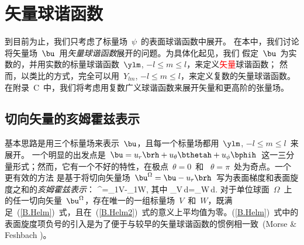 \section{矢量球谐函数}
%
%
\label{section:tv}

到目前为止，我们只考虑了标量场~$\psi$~的表面球谐函数中展开。
在本中，我们讨论将矢量场~$\bu$~用{\em 矢量球谐函数\/}展开的问题。为具体化起见，我们
假定~$\bu$~为实数的，并用实数的标量球谐函数~$\ylm$, $-l\leq m\leq l$，来定义\textcolor{red}{矢量}球谐函数；
然而，以类比的方式，完全可以用~$Y_{lm}$, $-l\leq m\leq l$，来定义复数的矢量球谐函数。
在附录~C~中，我们将考虑用复数广义球谐函数来展开矢量和更高阶的张量场。

\subsection{切向矢量的亥姆霍兹表示}
%
%
%

基本思路是用三个标量场来表示~$\bu$，且每一个标量场都用~$\ylm$, $-l\leq m\leq l$~来展开。
一个明显的出发点是~$\bu=u_r\brh+u_\theta\bthetah+u_\phi\bphih$~这一三分量形式；然而，它有一个不好的特性，在极点~$\theta=0$~和~ $\theta=\pi$~处为奇点。一个更有效的方法
是基于将切向矢量场~$\bu^{\Omega}=\bu-u_r\brh$~写为表面梯度和表面旋度之和的{\em 亥姆霍兹表示\/}：
\eq \label{B.Helm}
\bu^{\Omega}=\bdel_1V-\brh\times\bdel_1W,
\en
其中
\eq \label{B.Helm2}
\int_{\Omega}V\,d\/\Om=\int_{\Omega}W\,d\/.
\en
对于单位球面~$\Omega$~上的任一切向矢量~$\bu^{\Omega}$，存在唯一的一组标量场~$V$~和~$W$，既满足~(\ref{B.Helm})~式，且在~(\ref{B.Helm2})~式的意义上平均值为零。(\ref{B.Helm})~式中的表面旋度项负号的引入是为了便于与较早的矢量球谐函数的惯例相一致~(Morse \& Feshbach \citeyear{morse&feshbach53})。

